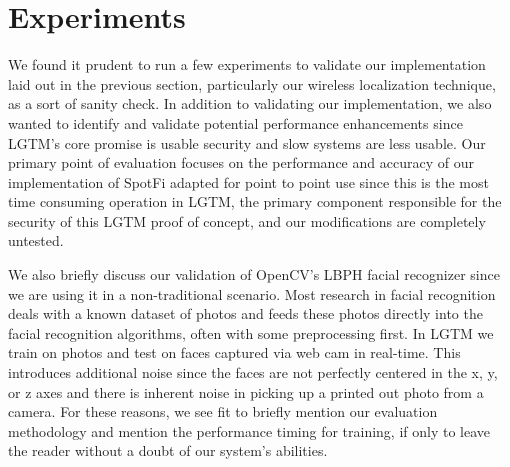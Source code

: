 \documentclass[12pt]{report}
\begin{document}


\chapter{Experiments}
We found it prudent to run a few experiments to validate our implementation laid out in the previous section, particularly our wireless localization technique, as a sort of sanity check. In addition to validating our implementation, we also wanted to identify and validate potential performance enhancements since LGTM's core promise is usable security and slow systems are less usable. Our primary point of evaluation focuses on the performance and accuracy of our implementation of SpotFi adapted for point to point use since this is the most time consuming operation in LGTM, the primary component responsible for the security of this LGTM proof of concept, and our modifications are completely untested. \par

We also briefly discuss our validation of OpenCV's LBPH facial recognizer since we are using it in a non-traditional scenario. Most research in facial recognition deals with a known dataset of photos and feeds these photos directly into the facial recognition algorithms, often with some preprocessing first. In LGTM we train on photos and test on faces captured via web cam in real-time. This introduces additional noise since the faces are not perfectly centered in the x, y, or z axes and there is inherent noise in picking up a printed out photo from a camera. For these reasons, we see fit to briefly mention our evaluation methodology and mention the performance timing for training, if only to leave the reader without a doubt of our system's abilities. \par
\end{document}

